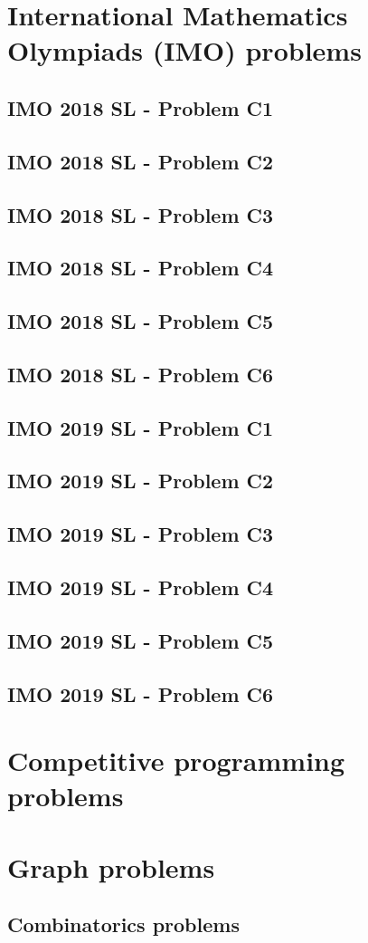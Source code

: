 \documentclass[12pt,openany,oneside]{book}
\begin{document}
\chapter{International Mathematics Olympiads (IMO) problems}

\section{IMO 2018 SL - Problem C1}
\section{IMO 2018 SL - Problem C2}
\section{IMO 2018 SL - Problem C3}
\section{IMO 2018 SL - Problem C4}
\section{IMO 2018 SL - Problem C5}
\section{IMO 2018 SL - Problem C6}

\section{IMO 2019 SL - Problem C1}
\section{IMO 2019 SL - Problem C2}
\section{IMO 2019 SL - Problem C3}
\section{IMO 2019 SL - Problem C4}
\section{IMO 2019 SL - Problem C5}
\section{IMO 2019 SL - Problem C6}

\chapter{Competitive programming problems}

\chapter{Graph problems}
\section{Combinatorics problems}



\end{document}
